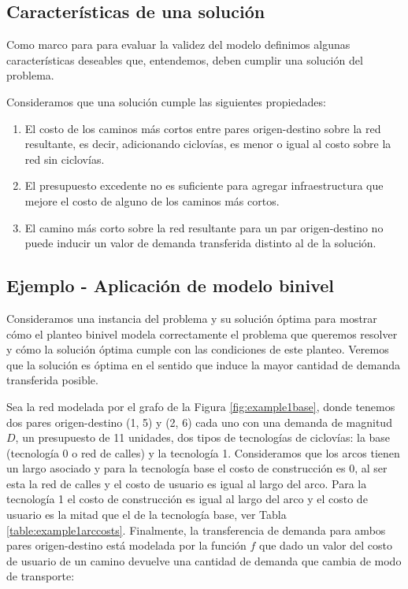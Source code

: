 \documentclass{article}
\begin{document}
  \subsection{Características de una solución}
  \label{sect:solutioncharacteristics}

  Como marco para para evaluar la validez del modelo definimos algunas características deseables que, entendemos, deben cumplir una solución del problema.

  Consideramos que una solución cumple las siguientes propiedades:

  \begin{enumerate}
      \item{El costo de los caminos más cortos entre pares origen-destino sobre la red resultante, es decir, adicionando ciclovías, es menor o igual al costo sobre la red sin ciclovías.}
    \item{\label{budgetexcess} El presupuesto excedente no es suficiente para agregar infraestructura que mejore el costo de alguno de los caminos más cortos.}
    \item{El camino más corto sobre la red resultante para un par origen-destino no puede inducir un valor de demanda transferida distinto al de la solución.}
  \end{enumerate}

  \subsection{Ejemplo - Aplicación de modelo binivel}
  \label{sect:example1}

  Consideramos una instancia del problema y su solución óptima para mostrar cómo el planteo binivel modela correctamente el problema que queremos resolver y cómo la solución óptima cumple con las condiciones de este planteo. Veremos que la solución es óptima en el sentido que induce la mayor cantidad de demanda transferida posible.

  Sea la red modelada por el grafo de la Figura \ref{fig:example1base}, donde tenemos dos pares origen-destino (1, 5) y (2, 6) cada uno con una demanda de magnitud $D$, un presupuesto de 11 unidades, dos tipos de tecnologías de ciclovías: la base (tecnología 0 o red de calles) y la tecnología 1. Consideramos que los arcos tienen un largo asociado y para la tecnología base el costo de construcción es 0, al ser esta la red de calles y el costo de usuario es igual al largo del arco. Para la tecnología 1 el costo de construcción es igual al largo del arco y el costo de usuario es la mitad que el de la tecnología base, ver Tabla \ref{table:example1arccosts}. Finalmente, la transferencia de demanda para ambos pares origen-destino está modelada por la función $f$ que dado un valor del costo de usuario de un camino devuelve una cantidad de demanda que cambia de modo de transporte:
\end{document}
